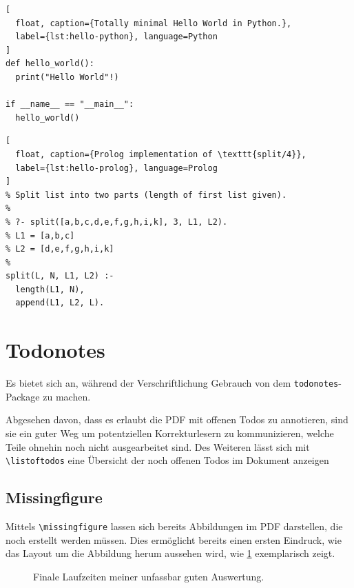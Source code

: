 \begin{lstlisting}[
  float, caption={Totally minimal Hello World in Python.},
  label={lst:hello-python}, language=Python
]
def hello_world():
  print("Hello World"!)

if __name__ == "__main__":
  hello_world()
\end{lstlisting}

\begin{lstlisting}[
  float, caption={Prolog implementation of \texttt{split/4}},
  label={lst:hello-prolog}, language=Prolog
]
% Split list into two parts (length of first list given).
%
% ?- split([a,b,c,d,e,f,g,h,i,k], 3, L1, L2).
% L1 = [a,b,c]
% L2 = [d,e,f,g,h,i,k]
%
split(L, N, L1, L2) :-
  length(L1, N),
  append(L1, L2, L).
\end{lstlisting}


\section{Todonotes}

Es bietet sich an, während der Verschriftlichung Gebrauch von dem
\texttt{todonotes}-Package zu machen.

Abgesehen davon, dass es erlaubt die PDF mit offenen Todos zu annotieren,
sind sie ein guter Weg um potentziellen Korrekturlesern zu kommunizieren,
welche Teile ohnehin noch nicht ausgearbeitet sind.
Des Weiteren lässt sich mit
\texttt{\textbackslash{}listoftodos} eine Übersicht der noch offenen Todos
im Dokument anzeigen

\listoftodos



\subsection{Missingfigure}

Mittels \texttt{\textbackslash{}missingfigure} lassen sich bereits Abbildungen
im PDF darstellen, die noch erstellt werden müssen. Dies ermöglicht bereits einen
ersten Eindruck, wie das Layout um die Abbildung herum aussehen wird,
wie \cref{fig:missing} exemplarisch zeigt.

\begin{figure}
  \centering
  \caption{Finale Laufzeiten meiner unfassbar guten Auswertung.}%
  \label{fig:missing}
\end{figure}


